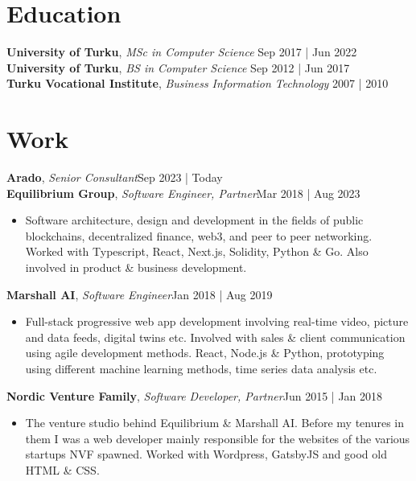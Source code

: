 \documentclass[line,margin]{res}
\begin{document}
\address{jani.anttonen@protonmail.ch | +358 40 589 0039 | Turku, Finland | https://janianttonen.com}

\begin{resume}
	\vspace{-5mm}

	\section{Education}
	\textbf{University of Turku}, {\sl MSc in Computer Science} \hfill Sep 2017 | Jun 2022\\
	\textbf{University of Turku}, {\sl BS in Computer Science} \hfill Sep 2012 | Jun 2017\\
	\textbf{Turku Vocational Institute}, {\sl Business Information Technology} \hfill 2007 | 2010\\

	\section{Work}
	\textbf{Arado}, {\sl Senior Consultant}\hfill Sep 2023 | Today\\

	\textbf{Equilibrium Group}, {\sl Software Engineer, Partner}\hfill Mar 2018 | Aug 2023\\
	\begin{itemize} \itemsep 3pt
	\item Software architecture, design and development in the fields of public blockchains, decentralized finance, web3, and peer to peer networking. Worked with Typescript, React, Next.js, Solidity, Python \& Go. Also involved in product \& business development.
	\end{itemize}

	\textbf{Marshall AI}, {\sl Software Engineer}\hfill Jan 2018 | Aug 2019\\
	\begin{itemize} \itemsep 3pt
	\item Full-stack progressive web app development involving real-time video, picture and data feeds, digital twins etc. Involved with sales \& client communication using agile development methods. React, Node.js \& Python, prototyping using different machine learning methods, time series data analysis etc.
	\end{itemize}

	\textbf{Nordic Venture Family}, {\sl Software Developer, Partner}\hfill Jun 2015 | Jan 2018\\
	\begin{itemize} \itemsep 3pt
	\item The venture studio behind Equilibrium \& Marshall AI. Before my tenures in them I was a web developer mainly responsible for the websites of the various startups NVF spawned. Worked with Wordpress, GatsbyJS and good old HTML \& CSS.
	\end{itemize}


\end{resume}
\end{document}
